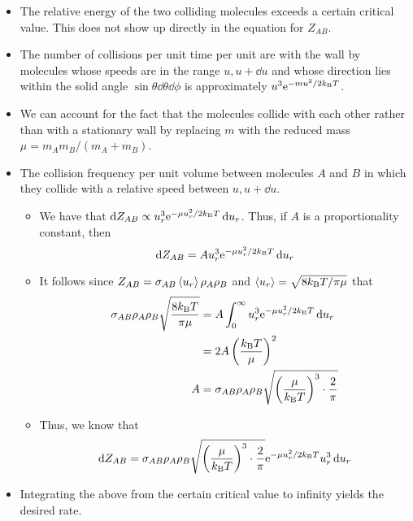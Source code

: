 \documentclass[../notes.tex]{subfiles}
\begin{document}
\begin{itemize}
\begin{itemize}
        \item The relative energy of the two colliding molecules exceeds a certain critical value. This does not show up directly in the equation for $Z_{AB}$.
        \item The number of collisions per unit time per unit are with the wall by molecules whose speeds are in the range $u,u+\dd{u}$ and whose direction lies within the solid angle $\sin\theta\dd{\theta}\dd{\phi}$ is approximately $u^3\e[-mu^2/2\kB T]$.
        \item We can account for the fact that the molecules collide with each other rather than with a stationary wall by replacing $m$ with the reduced mass $\mu=m_Am_B/(m_A+m_B)$.
        \item The collision frequency per unit volume between molecules $A$ and $B$ in which they collide with a relative speed between $u,u+\dd{u}$.
        \begin{itemize}
            \item We have that $\dd{Z_{AB}}\propto u_r^3\e[-\mu u_r^2/2\kB T]\dd{u_r}$. Thus, if $A$ is a proportionality constant, then
            \begin{equation*}
                \dd{Z_{AB}} = Au_r^3\e[-\mu u_r^2/2\kB T]\dd{u_r}
            \end{equation*}
            \item It follows since $Z_{AB}=\sigma_{AB}\prb{u_r}\rho_A\rho_B$ and $\prb{u_r}=\sqrt{8\kB T/\pi\mu}$ that
            \begin{align*}
                \sigma_{AB}\rho_A\rho_B\sqrt{\frac{8\kB T}{\pi\mu}} &= A\int_0^\infty u_r^3\e[-\mu u_r^2/2\kB T]\dd{u_r}\\
                &= 2A\left( \frac{\kB T}{\mu} \right)^2\\
                A &= \sigma_{AB}\rho_A\rho_B\sqrt{\left( \frac{\mu}{\kB T} \right)^3\cdot\frac{2}{\pi}}
            \end{align*}
            \item Thus, we know that
            \begin{equation*}
                \dd{Z_{AB}} = \sigma_{AB}\rho_A\rho_B\sqrt{\left( \frac{\mu}{\kB T} \right)^3\cdot\frac{2}{\pi}}\e[-\mu u_r^2/2\kB T]u_r^3\dd{u_r}
            \end{equation*}
        \end{itemize}
        \item Integrating the above from the certain critical value to infinity yields the desired rate.
    \end{itemize}

\end{itemize}
\end{document}
